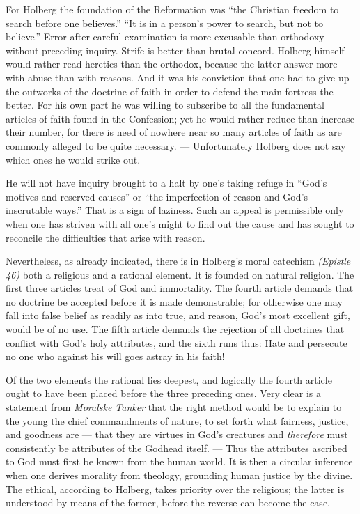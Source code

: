 \documentclass[12pt,a4paper]{book}
\newcommand{\opage}[1]{\marginnote{\footnotesize\textit{[#1]}}}
\begin{document}
For Holberg the foundation of the Reformation was ``the Christian freedom to
search before one believes.'' ``It is in a person's power to search, but not to
believe.'' Error after careful examination is more excusable than orthodoxy
without preceding inquiry. Strife is better than brutal concord. Holberg himself
would rather read heretics than the orthodox, because the latter answer more with
abuse than with reasons. And it was his conviction that one had to give up the
outworks of the doctrine of faith in order to defend the main fortress the
better. For his own part he was willing to subscribe to all the fundamental
articles of faith found in the Confession; yet he would rather reduce than
increase their number, for there is need of nowhere near so many articles of
faith as are commonly alleged to be quite necessary. --- Unfortunately Holberg
does not say which ones he would strike out.

He will not have inquiry brought to a halt by one's \opage{10}taking refuge in ``God's
motives and reserved causes'' or ``the imperfection of reason and God's
inscrutable ways.'' That is a sign of laziness. Such an appeal is permissible only
when one has striven with all one's might to find out the cause and has sought to
reconcile the difficulties that arise with reason.

Nevertheless, as already indicated, there is in Holberg's moral catechism
\emph{(Epistle 46)} both a religious and a rational element. It is founded on
natural religion. The first three articles treat of God and immortality. The
fourth article demands that no doctrine be accepted before it is made
demonstrable; for otherwise one may fall into false belief as readily as into
true, and reason, God's most excellent gift, would be of no use. The fifth
article demands the rejection of all doctrines that conflict with God's holy
attributes, and the sixth runs thus: Hate and persecute no one who against his
will goes astray in his faith!

Of the two elements the rational lies deepest, and logically the fourth article
ought to have been placed before the three preceding ones. Very clear is a
statement from \emph{Moralske Tanker} that the right method would be to explain to
the young the chief commandments of nature, to set forth what fairness, justice,
and goodness are --- that they are virtues in God's creatures and \emph{therefore}
must consistently be attributes of the Godhead itself. --- Thus the attributes
ascribed to God must first be known from the human world. It is then a circular
inference when one derives morality from theology, grounding human justice by the
divine. The ethical, according to Holberg, takes priority over the religious; the
latter is understood by means of the former, before the reverse can become the
case.
\end{document}
